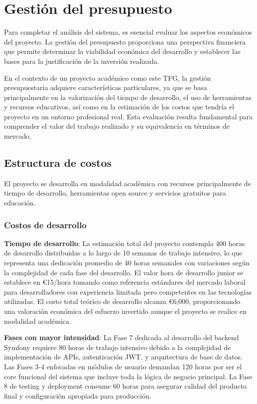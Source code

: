 \documentclass[12pt,a4paper,oneside]{report}
\begin{document}
\section{Gestión del presupuesto}\label{gestiuxf3n-del-presupuesto}

Para completar el análisis del sistema, es esencial evaluar los aspectos
económicos del proyecto. La gestión del presupuesto proporciona una
perspectiva financiera que permite determinar la viabilidad económica
del desarrollo y establecer las bases para la justificación de la
inversión realizada.

En el contexto de un proyecto académico como este TFG, la gestión
presupuestaria adquiere características particulares, ya que se basa
principalmente en la valorización del tiempo de desarrollo, el uso de
herramientas y recursos educativos, así como en la estimación de los
costos que tendría el proyecto en un entorno profesional real. Esta
evaluación resulta fundamental para comprender el valor del trabajo
realizado y su equivalencia en términos de mercado.

\subsection{Estructura de costos}\label{estructura-de-costos}

El proyecto se desarrolla en modalidad académica con recursos
principalmente de tiempo de desarrollo, herramientas open source y
servicios gratuitos para educación.

\subsubsection{Costos de desarrollo}\label{costos-de-desarrollo}

\textbf{Tiempo de desarrollo}: La estimación total del proyecto contempla 400 horas de desarrollo distribuidas a lo largo de 10 semanas de trabajo intensivo, lo que representa una dedicación promedio de 40 horas semanales con variaciones según la complejidad de cada fase del desarrollo. El valor hora de desarrollo junior se establece en €15/hora tomando como referencia estándares del mercado laboral para desarrolladores con experiencia limitada pero competentes en las tecnologías utilizadas. El costo total teórico de desarrollo alcanza €6,000, proporcionando una valoración económica del esfuerzo invertido aunque el proyecto se realice en modalidad académica.

\textbf{Fases con mayor intensidad}: La Fase 7 dedicada al desarrollo del backend Symfony requiere 80 horas de trabajo intensivo debido a la complejidad de implementación de APIs, autenticación JWT, y arquitectura de base de datos. Las Fases 3-4 enfocadas en módulos de usuario demandan 120 horas por ser el core funcional del sistema que incluye toda la lógica de negocio principal. La Fase 8 de testing y deployment consume 60 horas para asegurar calidad del producto final y configuración apropiada para producción.
\end{document}
